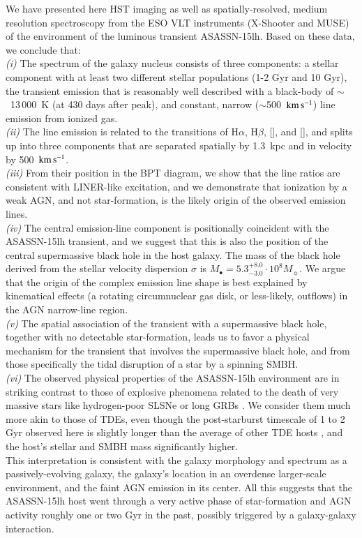 \documentclass[traditabstract]{aa}
\newcommand{\kms}{$\rm{km\,s^{-1}}$}
\newcommand{\hb}{H$\beta$}
\newcommand{\ha}{H$\alpha$}
\newcommand{\oiii}{[\ion{O}{iii}]}
\newcommand{\nii}{[\ion{N}{ii}]}
\begin{document}
We have presented here HST imaging as well as spatially-resolved, medium resolution spectroscopy from the ESO VLT instruments (X-Shooter and MUSE) of the environment of the luminous transient ASASSN-15lh. Based on these data, we conclude that:\\
\emph{(i)} The spectrum of the galaxy nucleus consists of three components: a stellar component with at least two different stellar populations (1-2 Gyr and 10 Gyr), the transient emission that is reasonably well described with a black-body of $\sim$~13\,000~K (at 430 days after peak), and constant, narrow ($\sim$500~\kms) line emission from ionized gas.\\
\textit{(ii)} The line emission is related to the transitions of \ha, \hb, \nii, and \oiii, and splits up into three components that are separated spatially by 1.3~kpc and in velocity by 500~\kms. \\
\textit{(iii)} From their position in the BPT diagram, we show that the line ratios are consistent with LINER-like excitation, and we demonstrate that ionization by a weak AGN, and not star-formation, is the likely origin of the observed emission lines.\\
\textit{(iv)} The central emission-line component is positionally coincident with the ASASSN-15lh transient, and we suggest that this is also the position of the central supermassive black hole in the host galaxy. The mass of the black hole derived from the stellar velocity dispersion $\sigma$ is $M_\bullet = 5.3_{-3.0}^{+8.0}\cdot10^{8} M_\sun$. We argue that the origin of the complex emission line shape is best explained by kinematical effects (a rotating circumnuclear gas disk, or less-likely, outflows) in the AGN narrow-line region.\\
\textit{(v)} The spatial association of the transient with a supermassive black hole, together with no detectable star-formation, leads us to favor a physical mechanism for the transient that involves the supermassive black hole, and from those specifically the tidal disruption of a star by a spinning SMBH.\\
\textit{(vi)} The observed physical properties of the ASASSN-15lh environment are in striking contrast to those of explosive phenomena related to the death of very massive stars like hydrogen-poor SLSNe \citep[e.g.,][]{2014ApJ...787..138L, 2016arXiv161205978S} or long GRBs \citep[e.g.,][]{2015A&A...581A.125K, 2017MNRAS.467.1795L, 2017RSOS....470304S}. We consider them much more akin to those of TDEs, even though the post-starburst timescale of 1 to 2 Gyr observed here is slightly longer than the average of other TDE hosts \citep[e.g.,][]{2017ApJ...835..176F, 2017arXiv170701559L}, and the host's stellar and SMBH mass significantly higher.\\
This interpretation is consistent with the galaxy morphology and spectrum as a passively-evolving galaxy, the galaxy's location in an overdense larger-scale environment, and the faint AGN emission in its center. All this suggests that the ASASSN-15lh host went through a very active phase of star-formation and AGN activity roughly one or two Gyr in the past, possibly triggered by a galaxy-galaxy interaction.
\end{document}

